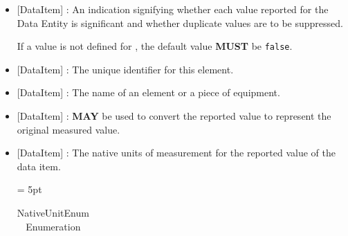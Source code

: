 \begin{itemize}
\item {}[DataItem] : An indication signifying whether each value reported for the \gls{Data Entity} is significant and whether duplicate values are to be suppressed.

If a value is not defined for , the default value \textbf{MUST} be \texttt{false}.

\item {}[DataItem] : The unique identifier for this element.

\item {}[DataItem] : The name of an element or a piece of equipment.

\item {}[DataItem] :  \textbf{MAY} be used to convert the reported value to represent the original measured value.

\item {}[DataItem] : The native units of measurement for the reported value of the data item.

\tabulinesep = 5pt
\begin{longtabu} to \textwidth {
    |l|X|}
\caption{NativeUnitEnum Enumeration}
\label{enum:NativeUnitEnum} \\


\end{longtabu}
\end{itemize}
